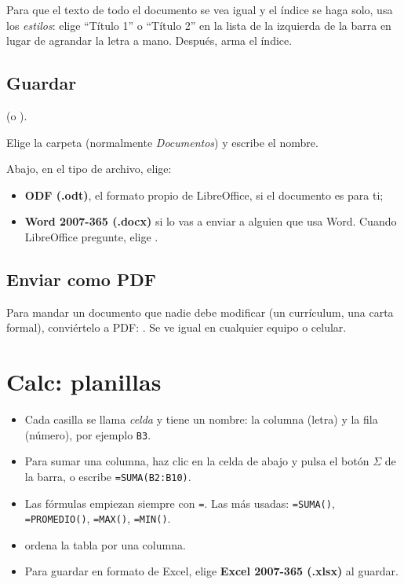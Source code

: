 \begin{consejo}
Para que el texto de todo el documento se vea igual y el índice se haga
solo, usa los \emph{estilos}: elige \enquote{Título 1} o \enquote{Título 2}
en la lista de la izquierda de la barra en lugar de agrandar la letra a
mano. Después,  arma el
índice.
\end{consejo}

\subsection{Guardar}
\begin{pasos}
  \item {} (o ).
  \item Elige la carpeta (normalmente \emph{Documentos}) y escribe el
        nombre.
  \item Abajo, en el tipo de archivo, elige:
    \begin{itemize}
      \item \textbf{ODF (.odt)}, el formato propio de LibreOffice, si el
            documento es para ti;
      \item \textbf{Word 2007-365 (.docx)} si lo vas a enviar a alguien que
            usa Word. Cuando LibreOffice pregunte, elige .
    \end{itemize}
\end{pasos}

\subsection{Enviar como PDF}
Para mandar un documento que nadie debe modificar (un currículum, una
carta formal), conviértelo a PDF: . Se ve
igual en cualquier equipo o celular.

\section{Calc: planillas}


\begin{itemize}
  \item Cada casilla se llama \emph{celda} y tiene un nombre: la columna
        (letra) y la fila (número), por ejemplo \texttt{B3}.
  \item Para sumar una columna, haz clic en la celda de abajo y pulsa el
        botón $\Sigma$ de la barra, o escribe \texttt{=SUMA(B2:B10)}.
  \item Las fórmulas empiezan siempre con \texttt{=}. Las más usadas:
        \texttt{=SUMA()}, \texttt{=PROMEDIO()}, \texttt{=MAX()},
        \texttt{=MIN()}.
  \item {} ordena la tabla por una columna.
  \item Para guardar en formato de Excel, elige \textbf{Excel 2007-365
        (.xlsx)} al guardar.
\end{itemize}

